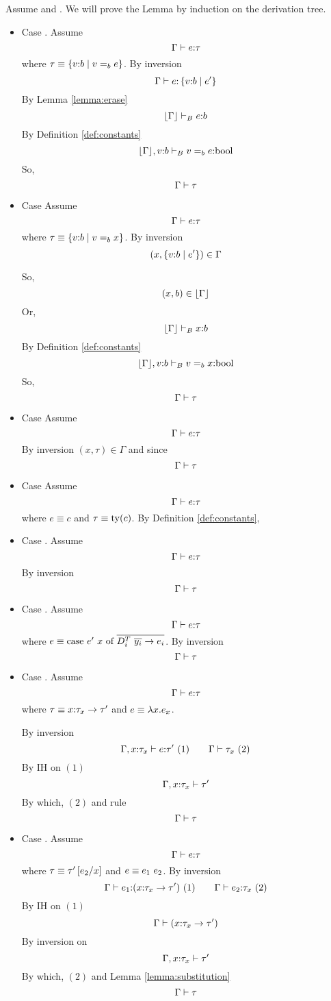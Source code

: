 Assume
\iswellformed{}{\Gamma} and .
We will prove the Lemma by induction on the derivation tree.
\begin{itemize}
\item Case \rtexact. Assume 
$$	\hastype{\Gamma}{e}{\tau} $$
where $\tau\equiv\tref{v}{b}{v \eqb{b} e}$.
By inversion
$$	
\hastype{\Gamma}{e}{\tref{v}{b}{e'}}
$$
By Lemma \ref{lemma:erase}
$$	
\hastypebase{\erase{\Gamma}}{e}{b}
$$
By Definition \ref{def:constants}
$$	
\hastypebase{\erase{\Gamma},v\colon b}{v \eqb{b} e}{\tbool}
$$
So, 
$$	
\iswellformed{\Gamma}{\tau}
$$

\item Case \rtvarbase
Assume 
$$	\hastype{\Gamma}{e}{\tau} $$
where $\tau\equiv\tref{v}{b}{v \eqb{b} x}$.
By inversion
$$	
(x,{\tref{v}{b}{e'}}) \in \Gamma
$$

So, 
$$	
(x,b) \in \erase{\Gamma}
$$
Or,
$$	
\hastypebase{\erase{\Gamma}}{x}{b}
$$
By Definition \ref{def:constants}
$$	
\hastypebase{\erase{\Gamma},v\colon b}{v \eqb{b} x}{\tbool}
$$
So, 
$$	
\iswellformed{\Gamma}{\tau}
$$
\item Case \rtvar
Assume $$\hastype{\Gamma}{e}{\tau}$$
By inversion $(x,\tau)\in \Gamma$ and since \iswellformed{}{\Gamma}
$$	
\iswellformed{\Gamma}{\tau}
$$
\item Case \rtconst
Assume $$\hastype{\Gamma}{e}{\tau}$$
where $e\equiv c$ and $\tau\equiv\ty{c}$.
By Definition \ref{def:constants},

\item Case \rtsub.
Assume 
$$	
	\hastype{\Gamma}{e}{\tau}
$$
By inversion
$$	\iswellformed{\Gamma}{\tau}
$$

\item Case \rtcase.
Assume
$$	
	\hastype{\Gamma}{e}{\tau}
$$
where $e \equiv \ecase{e'}{x}{\dcti}{\overline{y_i}}{e_i}$.
By inversion
$$	\iswellformed{\Gamma}{\tau}
$$
\item Case \rtfun.
Assume
$$
	\hastype{\Gamma}{e}{\tau}
$$
where $\tau\equiv\tfun{x}{\tau_x}{\tau'}$ 
and $e\equiv\efun{x}{e_x}$.

By inversion
$$
	\hastype{\Gamma, x\colon\tau_x}{e}{\tau'} \ (1) \qquad
	\iswellformed{\Gamma}{\tau_x}\ (2)
$$
By IH on $(1)$
$$
	\iswellformed{\Gamma, x\colon\tau_x}{\tau'}
$$
By which, $(2)$ and rule \rwfun
$$
	\iswellformed{\Gamma}{\tau}
$$

\item Case \rtapp. Assume
$$
	\hastype{\Gamma}{e}{\tau}
$$
where $\tau\equiv\tau'\sub{x}{e_2}$ 
and $e\equiv\eapp{e_1}{e_2}$.
By inversion
$$
	\hastype{\Gamma}{e_1}{(\tfun{x}{\tau_{x}}{\tau'})}\ (1) \qquad 
	\hastype{\Gamma}{e_2}{\tau_{x}}\ (2)
$$
By IH on $(1)$
$$
	\iswellformed{\Gamma}{(\tfun{x}{\tau_{x}}{\tau'})}
$$
By inversion on \rtapp
$$
	\iswellformed{\Gamma, x\colon\tau_x}{\tau'}
$$
By which, $(2)$ and Lemma \ref{lemma:substitution}
$$
	\iswellformed{\Gamma}{\tau}
$$
\end{itemize}